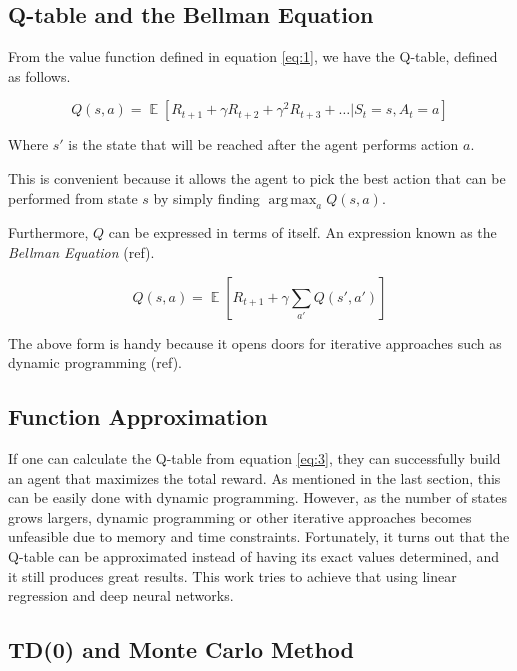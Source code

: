 \documentclass[11pt,twoside]{article}
\DeclareMathOperator*{\E}{\mathbb{E}}
\begin{document}
\subsection{Q-table and the Bellman Equation}

From the value function defined in equation \ref{eq:1}, we have the Q-table, defined as follows.

\begin{equation} \label{eq:2}
	Q(s, a) = \E [R_{t+1} + \gamma R_{t+2} + \gamma^{2} R_{t+3} + \ldots | S_t = s, A_t = a]
\end{equation}

Where $s'$ is the state that will be reached after the agent performs action $a$.

This is convenient because it allows the agent to pick the best action that can be performed from state $s$ by simply finding $\operatorname*{arg\,max}_{a} Q(s,a)$.

Furthermore, $Q$ can be expressed in terms of itself. An expression known as the \textit{Bellman Equation} (ref).

\begin{equation} \label{eq:3}
	Q(s, a) = \E [R_{t+1} + \gamma \sum_{a'} Q(s', a')]
\end{equation}

The above form is handy because it opens doors for iterative approaches such as dynamic programming (ref).

\subsection{Function Approximation}

If one can calculate the Q-table from equation \ref{eq:3}, they can successfully build an agent that maximizes the total reward. As mentioned in the last section, this can be easily done with dynamic programming. However, as the number of states grows largers, dynamic programming or other iterative approaches becomes unfeasible due to memory and time constraints. Fortunately, it turns out that the Q-table can be approximated instead of having its exact values determined, and it still produces great results. This work tries to achieve that using linear regression and deep neural networks.

\subsection{TD(0) and Monte Carlo Method}
\end{document}
